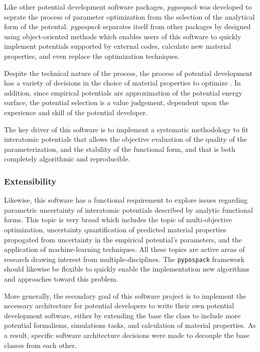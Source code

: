 Like other potential development software packages, \emph{pypospack} was developed to seprate the process of parameter optimization from the selection of the analytical form of the potental.  \emph{pypospack} separates itself from other packages by designed using object-oriented methods which enables users of this software to quickly implement potentials supported by external codes, calculate new material properties, and even replace the optimization techniques.

Despite the technical nature of the process, the process of potential development has a variety of decisions in the choice of material properties to optimize .  In addition, since empirical potentials are approximation of the potential energy surface, the potential selection is a value judgement, dependent upon the experience and skill of the potential developer.

The key driver of this software is to implement a systematic methodology to fit interatomic potentials that allows the objective evaluation of the quality of the parameterization, and the stability of the functional form, and that is both completely algorithmic and reproducible.

\subsubsection{Extensibility}

Likewise, this software has a functional requirement to explore issues regarding parametric uncertainty of interatomic potentials described by analytic functional forms.
This topic is very broad which includes the topic of multi-objective optimization, uncertainty quantification of predicted material properties propogated from uncertainty in the empirical potential's parameters, and the application of machine-learning techniques.
All these topics are active areas of research drawing interest from multiple-disciplines.  The \verb|pypospack| framework should likewise be flexible to quickly enable the implementation new algorithms and approaches toward this problem.

More generally, the secondary goal of this software project is to implement the necessary architecture for potential developers to write their own potential development software, either by extending the base the class to include more potential formalisms, simulations tasks, and calculation of material properties.  As a result, specific software architecture decisions were made to decouple the base classes from each other.

